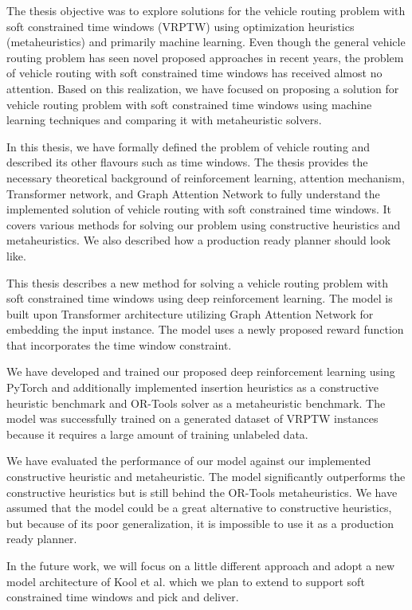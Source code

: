 \begin{conclusion}\label{conslusion}
The thesis objective was to explore solutions for the vehicle routing problem with soft constrained time windows (VRPTW) using optimization heuristics (metaheuristics) and primarily machine learning. Even though the general vehicle routing problem has seen novel proposed approaches in recent years, the problem of vehicle routing with soft constrained time windows has received almost no attention. Based on this realization, we have focused on proposing a solution for vehicle routing problem with soft constrained time windows using machine learning techniques and comparing it with metaheuristic solvers.

In this thesis, we have formally defined the problem of vehicle routing and described its other flavours such as time windows. The thesis provides the necessary theoretical background of reinforcement learning, attention mechanism, Transformer network, and Graph Attention Network to fully understand the implemented solution of vehicle routing with soft constrained time windows. It covers various methods for solving our problem using constructive heuristics and metaheuristics. We also described how a production ready planner should look like.

This thesis describes a new method for solving a vehicle routing problem with soft constrained time windows using deep reinforcement learning. The model is built upon Transformer architecture utilizing Graph Attention Network for embedding the input instance. The model uses a newly proposed reward function that incorporates the time window constraint. 

We have developed and trained our proposed deep reinforcement learning using PyTorch and additionally implemented insertion heuristics as a constructive heuristic benchmark and OR-Tools solver as a metaheuristic benchmark. The model was successfully trained on a generated dataset of VRPTW instances because it requires a large amount of training unlabeled data.

We have evaluated the performance of our model against our implemented constructive heuristic and metaheuristic. The model significantly outperforms the constructive heuristics but is still behind the OR-Tools metaheuristics. We have assumed that the model could be a great alternative to constructive heuristics, but because of its poor generalization, it is impossible to use it as a production ready planner.

In the future work, we will focus on a little different approach and adopt a new model architecture of Kool et al. \cite{dpdp} which we plan to extend to support soft constrained time windows and pick and deliver.
\end{conclusion}
